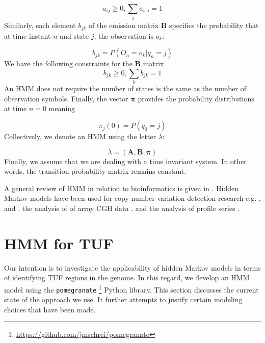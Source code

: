 \begin{equation}
a_{ij} \geq 0, \sum_{j} a_{i,j} = 1 
\end{equation}
Similarly, each element $b_{jk}$ of the emission matrix $\mathbf{B}$ specifies the probability that at time instant $n$ and state $j$, the observation is $o_k$:

\begin{equation}
b_{jk} = P(O_n = o_k | q_n = j)
\end{equation}
We have the following constraints for the $\mathbf{B}$ matrix
\begin{equation}
b_{jk} \geq 0, \sum_{k} b_{jk} = 1 
\label{emiss_prob_cond}
\end{equation}
An HMM does not require the number of states is the same as the number of observation symbols. 
Finally, the vector $\boldsymbol{\pi}$ provides the probability distributions at time $n=0$ meaning 

\begin{equation}
\pi_j(0) = P(q_0 = j)
\end{equation}
Collectively, we denote an HMM using the letter $\lambda$:

\begin{equation}
\lambda = (\mathbf{A}, \mathbf{B}, \boldsymbol{\pi})
\label{hmm}
\end{equation}
Finally, we assume that we are dealing with a time invariant system. In other words, the transition probability matrix remains constant. 

A general review of HMM in relation to bioinformatics is given in \cite{koski}. Hidden Markov models have been used for copy number variation detection research e.g. \cite{coella2007},  \cite{Wang2007} and  \cite{cahan2008}, the analysis of of array CGH data \cite{fridlyand2004}, and the analysis of profile series \cite{Sschliep2003}.


\section{HMM for TUF}
\label{hmm_tuf}

Our intention is to investigate the applicability of hidden Markov models in terms of identifying TUF regions in the genome. 
In this regard, we develop an HMM model using the \texttt{pomegranate} \footnote{\url{https://github.com/jmschrei/pomegranate}} Python library.
This section discusses the current state of the approach we use. It further attempts to justify certain modeling choices that have been made. 

